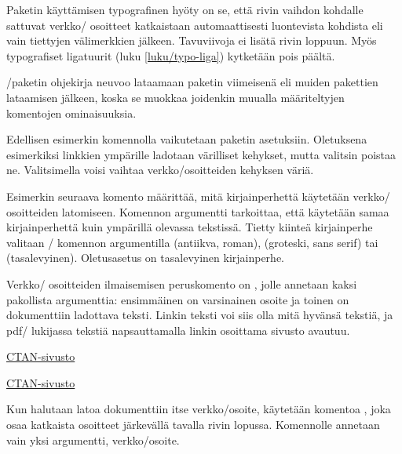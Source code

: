 Paketin käyttämisen typografinen hyöty on se, että rivin vaihdon
kohdalle sattuvat verkko\-/ osoitteet katkaistaan automaattisesti
luontevista kohdista eli vain tiettyjen välimerkkien jälkeen.
Tavuviivoja ei lisätä rivin loppuun. Myös typografiset ligatuurit (luku
\ref{luku/typo-liga}) kytketään pois päältä.

\-/paketin ohjekirja neuvoo lataamaan paketin
viimeisenä eli muiden pakettien lataamisen jälkeen, koska se
muokkaa joidenkin muualla määriteltyjen komentojen ominaisuuksia.

\begin{koodilohkosis}
\usepackage{hyperref}  %
\hypersetup{hidelinks} %
\end{koodilohkosis}

\noindent
Edellisen esimerkin komennolla  vaikutetaan
paketin asetuksiin. Oletuksena esimerkiksi linkkien ympärille
ladotaan värilliset kehykset, mutta valitsin  poistaa
ne. Valitsimella  voisi vaihtaa verkko\-/osoitteiden
kehyksen väriä.

Esimerkin seuraava komento  määrittää, mitä
kirjainperhettä käytetään verkko\-/ osoitteiden latomiseen. Komennon
argumentti  tarkoittaa, että käytetään samaa kirjainperhettä
kuin ympärillä olevassa tekstissä. Tietty kiinteä kirjainperhe valitaan
\-/ komennon argumentilla  (antiikva,
roman),  (groteski, sans serif) tai  (tasalevyinen).
Oletusasetus on tasalevyinen kirjainperhe.

Verkko\-/ osoitteiden ilmaisemisen peruskomento on ,
jolle annetaan kaksi pakollista argumenttia: ensimmäinen on varsinainen
osoite ja toinen on dokumenttiin ladottava teksti. Linkin teksti voi
siis olla mitä hyvänsä tekstiä, ja pdf\-/ lukijassa tekstiä
napsauttamalla linkin osoittama sivusto avautuu.

\begin{koodilohkosis}
\href{https://www.ctan.org/}{CTAN-sivusto}
\end{koodilohkosis}

\begin{tulossis}
  \href{https://www.ctan.org/}{CTAN-sivusto}
\end{tulossis}

\noindent
Kun halutaan latoa dokumenttiin itse verkko\-/osoite, käytetään komentoa
, joka osaa katkaista osoitteet järkevällä tavalla rivin
lopussa. Komennolle annetaan vain yksi argumentti, verkko\-/osoite.

